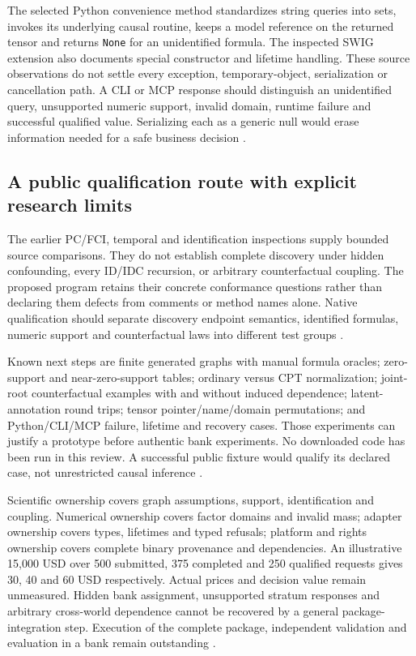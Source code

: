 The selected Python convenience method standardizes string queries into
sets, invokes its underlying causal routine, keeps a model reference on the
returned tensor and returns \texttt{None} for an unidentified formula.
The inspected SWIG extension also documents special constructor and lifetime
handling. These source observations do not settle every exception,
temporary-object, serialization or cancellation path. A CLI or MCP response
should distinguish an unidentified query, unsupported numeric support,
invalid domain, runtime failure and successful qualified value. Serializing
each as a generic null would erase information needed for a safe business
decision \cite{exec24_agrum_source,exec24_agrum_choice}.

\subsection{A public qualification route with explicit research limits}
The earlier PC/FCI, temporal and identification inspections supply bounded
source comparisons. They do not establish complete discovery under hidden
confounding, every ID/IDC recursion, or arbitrary counterfactual coupling.
The proposed program retains their concrete conformance questions rather
than declaring them defects from comments or method names alone. Native
qualification should separate discovery endpoint semantics, identified
formulas, numeric support and counterfactual laws into different test groups
\cite{exec13_cxx_agrum,exec14_native_agrum,exec16_ct_agrum,
exec19_cxx_identification_source,exec24_agrum_choice}.

Known next steps are finite generated graphs with manual formula oracles;
zero-support and near-zero-support tables; ordinary versus CPT normalization;
joint-root counterfactual examples with and without induced dependence;
latent-annotation round trips; tensor pointer/name/domain permutations;
and Python/CLI/MCP failure, lifetime and recovery cases. Those experiments
can justify a prototype before authentic bank experiments. No downloaded
code has been run in this review. A successful public fixture would qualify
its declared case, not unrestricted causal inference
\cite{exec24_agrum_choice}.

Scientific ownership covers graph assumptions, support, identification and
coupling. Numerical ownership covers factor domains and invalid mass;
adapter ownership covers types, lifetimes and typed refusals; platform and
rights ownership covers complete binary provenance and dependencies.
An illustrative 15,000 USD over 500 submitted, 375 completed and 250
qualified requests gives 30, 40 and 60 USD respectively. Actual prices and
decision value remain unmeasured. Hidden bank assignment, unsupported
stratum responses and arbitrary cross-world dependence cannot be recovered
by a general package-integration step. Execution of the complete package, independent validation and evaluation in a bank remain outstanding \cite{exec24_agrum_choice}.
